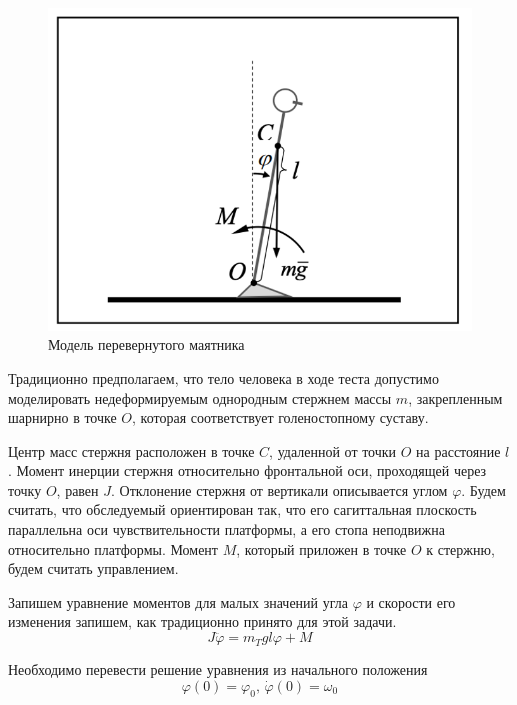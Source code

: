 \documentclass[a4paper,14pt]{article}
\theoremstyle{plain} %
\theoremstyle{definition} %
\theoremstyle{remark} %
\begin{document}
{\begin{figure}[h!]
    \centering
    \includegraphics[width=1.00\linewidth]{pendulum.png}
    \caption{Модель перевернутого маятника}
    \label{fig:pendulum}
\end{figure}

Традиционно предполагаем, что тело человека в ходе теста допустимо
моделировать недеформируемым однородным стержнем массы $m$,
закрепленным шарнирно в точке $O$, которая соответствует
голеностопному суставу.

Центр масс стержня расположен в точке $C$, удаленной от точки $O$
на расстояние $l$. Момент инерции стержня относительно фронтальной
оси, проходящей через точку $O$, равен $J$. Отклонение стержня от
вертикали описывается углом $\varphi$. Будем считать, что обследуемый
ориентирован так, что его сагиттальная плоскость параллельна оси
чувствительности платформы, а его стопа неподвижна относительно
платформы. Момент $M$, который приложен в точке $O$ к стержню,
будем считать управлением.

Запишем уравнение моментов для малых значений угла $\varphi$ и
скорости его изменения запишем, как традиционно принято для этой задачи.
\begin{equation}\label{6}
    J\ddot{\varphi}= m_Tgl\varphi+M
\end{equation}

Необходимо перевести решение уравнения из начального положения
\begin{equation}\label{7}
    \varphi(0)=\varphi_0, \,\dot{\varphi}(0)=\omega_0
\end{equation}

}
\end{document}
